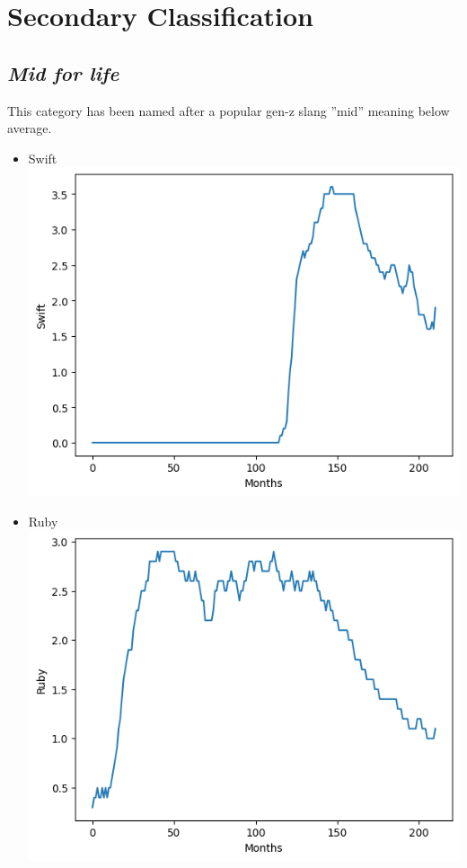 \documentclass[conference]{IEEEtran}
\begin{document}
\section{Secondary Classification}

\subsection{\textit{Mid for life}}
This category has been named after a popular gen-z slang ''mid'' meaning below average.

\begin{itemize}
\item{Swift}
\includegraphics[scale=0.4]{lineplot/swift.png}
\item{Ruby}
\includegraphics[scale=0.4]{lineplot/ruby.png}

\end{itemize}
\end{document}
